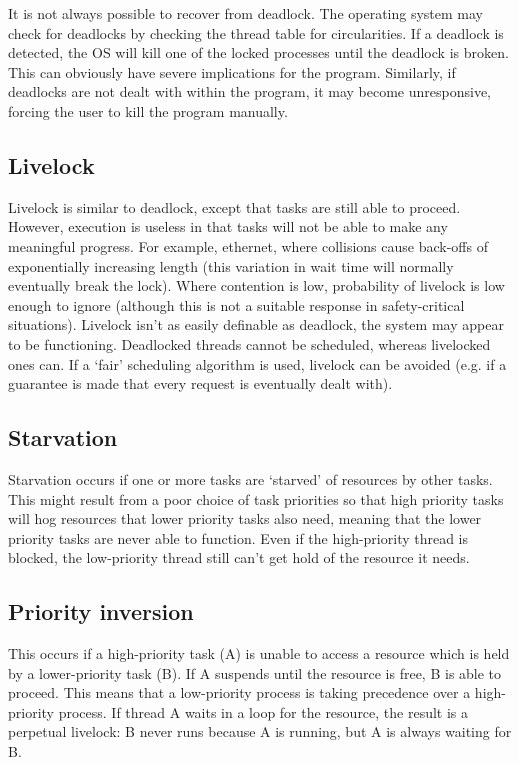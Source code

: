 \documentclass[a4paper,oneside]{report}
\begin{document}
    	It is not always possible to recover from deadlock. The operating system may check for deadlocks by checking the thread table for circularities. If a deadlock is detected, the OS will kill one of the locked processes until the deadlock is broken. This can obviously have severe implications for the program. Similarly, if deadlocks are not dealt with within the program, it may become unresponsive, forcing the user to kill the program manually.
    	
    	\subsection{Livelock}
    	Livelock is similar to deadlock, except that tasks are still able to proceed. However, execution is useless in that tasks will not be able to make any meaningful progress. For example, ethernet, where collisions cause back-offs of exponentially increasing length (this variation in wait time will normally eventually break the lock). Where contention is low, probability of livelock is low enough to ignore (although this is not a suitable response in safety-critical situations). Livelock isn't as easily definable as deadlock, the system may appear to be functioning. Deadlocked threads cannot be scheduled, whereas livelocked ones can. If a `fair' scheduling algorithm is used, livelock can be avoided (e.g. if a guarantee is made that every request is eventually dealt with). 
    	
    	\subsection{Starvation}
    	Starvation occurs if one or more tasks are `starved' of resources by other tasks. This might result from a poor choice of task priorities so that high priority tasks will hog resources that lower priority tasks also need, meaning that the lower priority tasks are never able to function. Even if the high-priority thread is blocked, the low-priority thread still can’t get hold of the resource it needs.
    	
    	\subsection{Priority inversion}
    	This occurs if a high-priority task (A) is unable to access a resource which is held by a lower-priority task (B). If A suspends until the resource is free, B is able to proceed. This means that a low-priority process is taking precedence over a high-priority process. If thread A waits in a loop for the resource, the result is a perpetual livelock: B never runs because A is running, but A is always waiting for B.
    	
\end{document}
